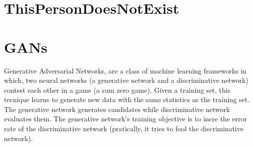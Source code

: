 \section{ThisPersonDoesNotExist}
\section{GANs}
Generative Adversarial Networks\cite{AICI, UGAN, DPG}, are a class of machine
learning frameworks in which, two neural networks (a generative network
and a discriminative network) contest each other in a game (a sum zero
game).
Given a training set, this tecnique learns to generate new data with the
same statistics as the training set.
The generative network generates candidates while discriminative network
evaluates them. The generative network’s training objective is to incre
the error rate of the discriminative network (pratically, it tries to fool the
discriminative network).
